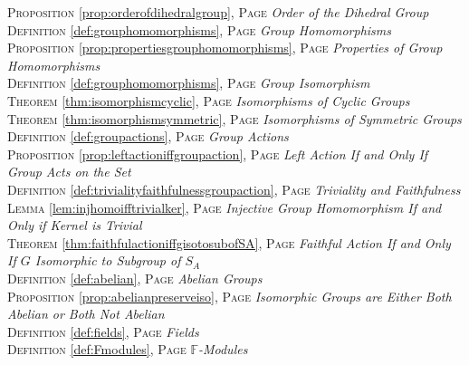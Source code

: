 \begin{multicols}{2}
{\textsc{Proposition} \ref{prop:orderofdihedralgroup}, \textsc{Page} \pageref{prop:orderofdihedralgroup} \textit{Order of the Dihedral Group} \\
\textsc{Definition} \ref{def:grouphomomorphisms}, \textsc{Page} \pageref{def:grouphomomorphisms} \textit{Group Homomorphisms} \\
\textsc{Proposition} \ref{prop:propertiesgrouphomomorphisms}, \textsc{Page} \pageref{prop:propertiesgrouphomomorphisms} \textit{Properties of Group Homomorphisms} \\
\textsc{Definition} \ref{def:grouphomomorphisms}, \textsc{Page} \pageref{def:grouphomomorphisms} \textit{Group Isomorphism} \\
\textsc{Theorem} \ref{thm:isomorphismcyclic}, \textsc{Page} \pageref{thm:isomorphismcyclic} \textit{Isomorphisms of Cyclic Groups} \\
\textsc{Theorem} \ref{thm:isomorphismsymmetric}, \textsc{Page} \pageref{thm:isomorphismsymmetric} \textit{Isomorphisms of Symmetric Groups} \\
\textsc{Definition} \ref{def:groupactions}, \textsc{Page} \pageref{def:groupactions} \textit{Group Actions} \\
\textsc{Proposition} \ref{prop:leftactioniffgroupaction}, \textsc{Page} \pageref{prop:leftactioniffgroupaction} \textit{Left Action If and Only If Group Acts on the Set} \\
\textsc{Definition} \ref{def:trivialityfaithfulnessgroupaction}, \textsc{Page} \pageref{def:trivialityfaithfulnessgroupaction} \textit{Triviality and Faithfulness} \\
\textsc{Lemma} \ref{lem:injhomoifftrivialker}, \textsc{Page} \pageref{lem:injhomoifftrivialker} \textit{Injective Group Homomorphism If and Only if Kernel is Trivial} \\
\textsc{Theorem} \ref{thm:faithfulactioniffgisotosubofSA}, \textsc{Page} \pageref{thm:faithfulactioniffgisotosubofSA} \textit{Faithful Action If and Only If \(G\) Isomorphic to Subgroup of \(S_A\)} \\
\textsc{Definition} \ref{def:abelian}, \textsc{Page} \pageref{def:abelian} \textit{Abelian Groups} \\
\textsc{Proposition} \ref{prop:abelianpreserveiso}, \textsc{Page} \pageref{prop:abelianpreserveiso} \textit{Isomorphic Groups are Either Both Abelian or Both Not Abelian} \\
\textsc{Definition} \ref{def:fields}, \textsc{Page} \pageref{def:fields} \textit{Fields} \\
\textsc{Definition} \ref{def:Fmodules}, \textsc{Page} \pageref{def:Fmodules} \textit{\(\mathbb {F}\)-Modules} \\
}
\end{multicols}
